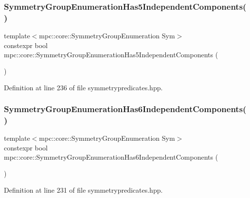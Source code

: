 \subsubsection{\texorpdfstring{Symmetry\+Group\+Enumeration\+Has5\+Independent\+Components()}{SymmetryGroupEnumerationHas5IndependentComponents()}}
{\footnotesize\ttfamily template$<$mpc\+::core\+::\+Symmetry\+Group\+Enumeration Sym$>$ \\
constexpr bool mpc\+::core\+::\+Symmetry\+Group\+Enumeration\+Has5\+Independent\+Components (\begin{DoxyParamCaption}{ }\end{DoxyParamCaption})\hspace{0.3cm}{\ttfamily [inline]}}



Definition at line 236 of file symmetrypredicates.\+hpp.

\mbox{\label{namespacempc_1_1core_a35a6a7755ecf1facefe9fc495ba8562e}} 
\subsubsection{\texorpdfstring{Symmetry\+Group\+Enumeration\+Has6\+Independent\+Components()}{SymmetryGroupEnumerationHas6IndependentComponents()}}
{\footnotesize\ttfamily template$<$mpc\+::core\+::\+Symmetry\+Group\+Enumeration Sym$>$ \\
constexpr bool mpc\+::core\+::\+Symmetry\+Group\+Enumeration\+Has6\+Independent\+Components (\begin{DoxyParamCaption}{ }\end{DoxyParamCaption})\hspace{0.3cm}{\ttfamily [inline]}}



Definition at line 231 of file symmetrypredicates.\+hpp.

\mbox{\label{namespacempc_1_1core_a04ff2937be881ddc1aee34d59d6b7af5}} 
